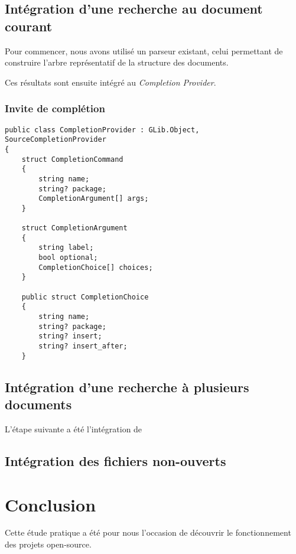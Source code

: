 \documentclass[a4paper,11pt]{report}
\begin{document}
\section{Intégration d'une recherche au document courant}
Pour commencer, nous avons utilisé un parseur existant, celui permettant de construire l'arbre représentatif de la structure des documents.

%

Ces résultats sont ensuite intégré au \textit{Completion Provider}.

\subsection{Invite de complétion}

\lstset{language=[Sharp]C}
\begin{lstlisting}[frame=single]
public class CompletionProvider : GLib.Object, SourceCompletionProvider
{
    struct CompletionCommand
    {
        string name;
        string? package;
        CompletionArgument[] args;
    }

    struct CompletionArgument
    {
        string label;
        bool optional;
        CompletionChoice[] choices;
    }

    public struct CompletionChoice
    {
        string name;
        string? package;
        string? insert;
        string? insert_after;
    }
\end{lstlisting}

\section{Intégration d'une recherche à plusieurs documents}

L'étape suivante a été l'intégration de 

\section{Intégration des fichiers non-ouverts}

\chapter{Conclusion}
Cette étude pratique a été pour nous l'occasion de découvrir le fonctionnement des projets open-source.
\end{document}

